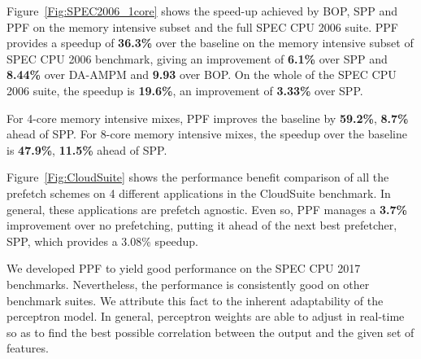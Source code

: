 Figure~\ref{Fig:SPEC2006_1core} shows the speed-up achieved by BOP, SPP and
PPF on the memory intensive subset and the full SPEC CPU 2006 suite. 
PPF provides a speedup of \textbf{36.3\%} over the baseline on the 
memory intensive subset of SPEC CPU
2006 benchmark, giving an improvement of \textbf{6.1\%} over SPP and
\textbf{8.44\%} over DA-AMPM and \textbf{9.93} over BOP. On the whole of 
the SPEC CPU 2006 suite, the speedup is \textbf{19.6\%}, an improvement 
of \textbf{3.33\%} over SPP.

For 4-core memory intensive mixes, PPF improves the baseline by
\textbf{59.2\%}, \textbf{8.7\%} ahead of SPP. For 8-core memory intensive
mixes, the speedup over the baseline is \textbf{47.9\%}, \textbf{11.5\%} ahead
of SPP.

Figure~\ref{Fig:CloudSuite} shows the performance benefit comparison of all
the prefetch schemes on 4 different applications in the CloudSuite benchmark.
In general, these applications are prefetch agnostic. Even so, PPF manages a
\textbf{3.7\%} improvement over no prefetching, putting it ahead of the next
best prefetcher, SPP, which provides a 3.08\% speedup.

We developed PPF to yield good performance on the SPEC CPU 2017 benchmarks.
Nevertheless, the performance is consistently good on other benchmark suites.
We attribute this fact to the inherent adaptability of the perceptron model.
In general, perceptron weights are able to adjust in real-time so as to find
the best possible correlation between the output and the given set of
features.

